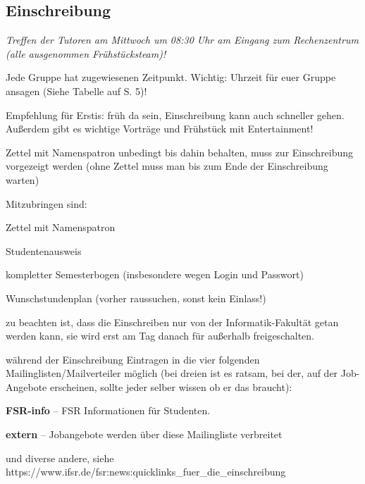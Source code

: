 \documentclass[a4paper,12pt]{report}
\begin{document}
\subsection{Einschreibung}
\begin{itemize*}
	\item \textit{Treffen der Tutoren am Mittwoch um 08:30 Uhr am Eingang zum Rechenzentrum (alle ausgenommen Frühstücksteam)!}
	\item Jede Gruppe hat zugewiesenen Zeitpunkt. Wichtig: Uhrzeit für euer Gruppe ansagen (Siehe Tabelle auf S. 5)!
	\item Empfehlung für Erstis: früh da sein, Einschreibung kann auch schneller gehen. Außerdem gibt es wichtige Vorträge und Frühstück mit Entertainment!
	\item Zettel mit Namenspatron unbedingt bis dahin behalten, muss zur Einschreibung vorgezeigt werden (ohne Zettel muss man bis zum Ende der Einschreibung warten)
	\item Mitzubringen sind:
		\begin{itemize*}
		\item Zettel mit Namenspatron
		\item Studentenausweis
		\item kompletter Semesterbogen (insbesondere wegen Login und Passwort)
		\item Wunschstundenplan (vorher raussuchen, sonst kein Einlass!)
		\item zu beachten ist, dass die Einschreiben nur von der Informatik-Fakultät getan werden kann, sie wird erst am Tag danach für außerhalb freigeschalten.
	\end{itemize*}
	\item während der Einschreibung Eintragen in die vier folgenden Mailinglisten/Mailverteiler möglich (bei dreien ist es ratsam, bei der, auf der Job-Angebote erscheinen, sollte jeder selber wissen ob er das braucht):
		\begin{itemize*}
		\item \textbf{FSR-info} -- FSR Informationen für Studenten.
		\item \textbf{extern} -- Jobangebote werden über diese Mailingliste verbreitet
		\item und diverse andere, siehe \\ https://www.ifsr.de/fsr:news:quicklinks\_fuer\_die\_einschreibung
	\end{itemize*}
\end{itemize*}
\end{document}
